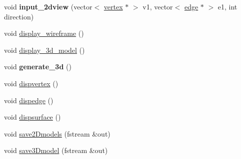 \begin{DoxyCompactItemize}
\item 
void {\bfseries input\+\_\+2dview} (vector$<$ \hyperlink{classvertex}{vertex} $\ast$ $>$ v1, vector$<$ \hyperlink{classedge}{edge} $\ast$ $>$ e1, int direction)\hypertarget{classmodel__3d_af86b714c5ac6732e4127400283a00155}{}\label{classmodel__3d_af86b714c5ac6732e4127400283a00155}

\item 
void \hyperlink{classmodel__3d_a759ba04f608f0f49622e67d158b54d26}{display\+\_\+wireframe} ()
\item 
void \hyperlink{classmodel__3d_a2814763ae3e114fbd8f73b9f59a93c46}{display\+\_\+3d\+\_\+model} ()
\item 
void {\bfseries generate\+\_\+3d} ()\hypertarget{classmodel__3d_a8c66ba2bd9a3c58f1245db43d2b9f80f}{}\label{classmodel__3d_a8c66ba2bd9a3c58f1245db43d2b9f80f}

\item 
void \hyperlink{classmodel__3d_aec3a3507db23d9760aad5a185055767b}{dispvertex} ()
\item 
void \hyperlink{classmodel__3d_a96c90da2bbd278d2216e9ec2ce3202ed}{dispedge} ()
\item 
void \hyperlink{classmodel__3d_aff96d90d947d43be43e360a00d7f58d9}{dispsurface} ()
\item 
void \hyperlink{classmodel__3d_a1fd25e51ac11352b59029881144a0cee}{save2\+Dmodels} (fstream \&out)
\item 
void \hyperlink{classmodel__3d_a81258ba879d85e5a286cecb3e85356a2}{save3\+Dmodel} (fstream \&out)
\end{DoxyCompactItemize}
